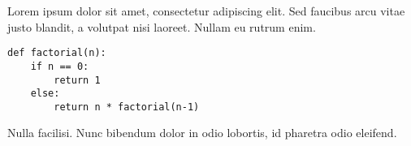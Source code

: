 \documentclass{article}
\begin{document}
Lorem ipsum dolor sit amet, consectetur adipiscing elit. Sed faucibus arcu vitae justo blandit, a volutpat nisi laoreet. Nullam eu rutrum enim.

\begin{lstlisting}[style=mystyle, caption=Example code in Python, label=lst:python]
def factorial(n):
    if n == 0:
        return 1
    else:
        return n * factorial(n-1)
\end{lstlisting}

Nulla facilisi. Nunc bibendum dolor in odio lobortis, id pharetra odio eleifend.
\end{document}
